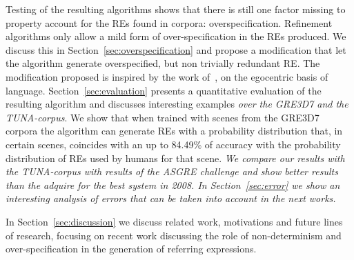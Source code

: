 Testing of the resulting algorithms shows that there is still one factor missing to property account for the REs found in corpora: overspecification.  Refinement algorithms only allow a mild form of over-specification in the REs produced.  We discuss this in 
Section~\ref{sec:overspecification} and propose a modification that let the algorithm generate overspecified, but non trivially redundant RE.  The modification proposed is inspired by the work of~, on the egocentric basis of language.  
Section~\ref{sec:evaluation} presents a quantitative evaluation of the resulting algorithm and discusses interesting examples \textit{over the GRE3D7 and the TUNA-corpus}. 
We show that when trained with scenes from the GRE3D7 corpora the algorithm can generate REs with a probability distribution that, 
in certain scenes, coincides with an up to 84.49\% of accuracy with the probability distribution of REs used by humans for that scene. 
\textit{We compare our results with the TUNA-corpus with results of the ASGRE challenge and show better results than the adquire for the best system in 2008.
In Section~\ref{sec:error} we show an interesting analysis of errors that can be taken into account in the next works.}

In Section~\ref{sec:discussion} we discuss related work, motivations and future lines of research, focusing on recent work discussing the role 
of non-determinism and over-specification in the generation of referring expressions. 

